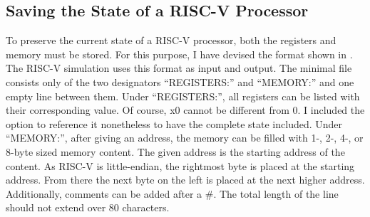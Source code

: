 \subsection{Saving the State of a RISC-V
      Processor}\label{sub:statefile}

To preserve the current state of a RISC-V processor, both the
registers and memory must be stored. For this purpose, I have devised
the format shown in . The RISC-V simulation
uses this format as input and output. The minimal file consists only
of the two designators \enquote{REGISTERS:} and \enquote{MEMORY:} and
one empty line between them. Under \enquote{REGISTERS:}, all
registers can be listed with their corresponding value. Of course, x0
cannot be different from 0. I included the option to reference it
nonetheless to have the complete state included. Under
\enquote{MEMORY:}, after giving an address, the memory can be filled
with 1-, 2-, 4-, or 8-byte sized memory content. The given address is
the starting address of the content. As RISC-V is little-endian, the
rightmost byte is placed at the starting address. From there the next
byte on the left is placed at the next higher address. Additionally,
comments can be added after a \#. The total length of the line should
not extend over 80 characters.

